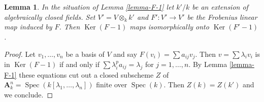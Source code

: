 \documentclass[10pt,a4paper]{amsart}
\theoremstyle{plain}
\newtheorem{lemma}[subsection]{Lemma}
\theoremstyle{definition}
\theoremstyle{remark}
\numberwithin{equation}{subsection}
\def\Spec{\mathop{\mathrm{Spec}}}
\def\Ker{\mathop{\mathrm{Ker}}}
\begin{document}
\begin{lemma}
\label{lemma-F-2}
In the situation of Lemma \ref{lemma-F-1} let $k'/k$ be an extension
of algebraically closed fields. Set $V' = V \otimes_k k'$ and
$F' : V' \to V'$ be the Frobenius linear map induced by $F$.
Then $\Ker(F - 1)$ maps isomorphically onto $\Ker(F' - 1)$.
\end{lemma}

\begin{proof}
Let $v_1, \ldots, v_n$ be a basis of $V$ and say $F(v_i) = \sum a_{ij}v_j$.
Then $v = \sum \lambda_i v_i$ is in $\Ker(F - 1)$ if and only if
$\sum \lambda_i^pa_{ij} = \lambda_j$ for $j = 1, \ldots, n$.
By Lemma \ref{lemma-F-1} these equations
cut out a closed subscheme $Z$ of
$\mathbf{A}^n_k = \Spec(k[\lambda_1, \ldots, \lambda_n])$
finite over $\Spec(k)$. Then $Z(k) = Z(k')$ and we conclude.
\end{proof}
\end{document}
